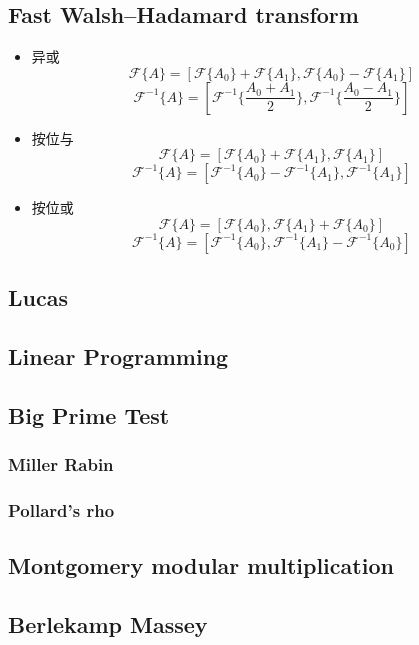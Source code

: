 \subsection{Fast Walsh–Hadamard transform}
\begin{itemize}
\item 异或
$$
\mathcal{F}\{A\} =
\left[\mathcal{F}\{A_0\}+\mathcal{F}\{A_1\},
\mathcal{F}\{A_0\}-\mathcal{F}\{A_1\}\right]
$$
$$
\mathcal{F}^{-1}\{A\} =
\left[
\mathcal{F}^{-1}\{\frac{A_0+A_1}{2}\},
\mathcal{F}^{-1}\{\frac{A_0-A_1}{2}\}
\right]
$$
\item 按位与
$$
\mathcal{F}\{A\} =
\left[\mathcal{F}\{A_0\}+\mathcal{F}\{A_1\},
\mathcal{F}\{A_1\}\right]
$$
$$
\mathcal{F}^{-1}\{A\} =
\left[
\mathcal{F}^{-1}\{A_0\}-\mathcal{F}^{-1}\{A_1\},
\mathcal{F}^{-1}\{A_1\}
\right]
$$
\item 按位或
$$
\mathcal{F}\{A\} =
\left[\mathcal{F}\{A_0\},
\mathcal{F}\{A_1\}+\mathcal{F}\{A_0\}\right]
$$
$$
\mathcal{F}^{-1}\{A\} =
\left[
\mathcal{F}^{-1}\{A_0\},
\mathcal{F}^{-1}\{A_1\}-\mathcal{F}^{-1}\{A_0\}
\right]
$$
\end{itemize}


\subsection{Lucas}


\subsection{Linear Programming}


\subsection{Big Prime Test}

\subsubsection{Miller Rabin}

\subsubsection{Pollard's rho}


\subsection{Montgomery modular multiplication}


\subsection{Berlekamp Massey}


